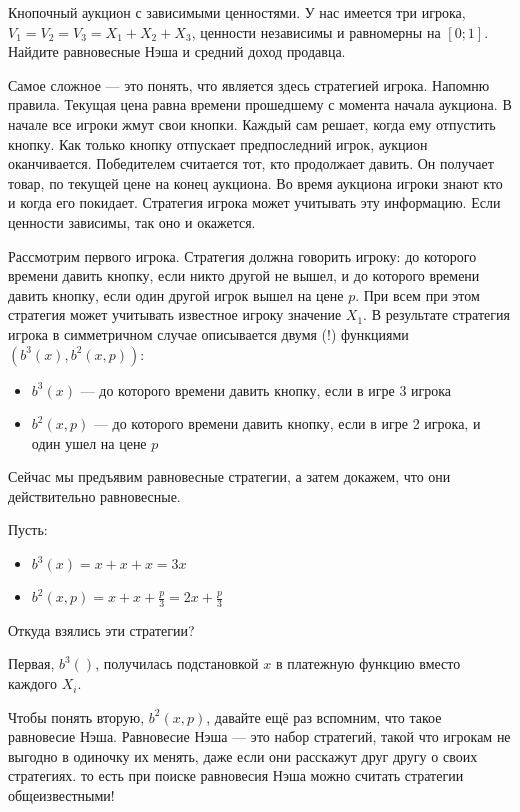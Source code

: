 \begin{myex} Кнопочный аукцион с зависимыми ценностями.
У нас имеется три игрока, $ V_{1}=V_{2}=V_{3}=X_{1}+X_{2}+X_{3} $, ценности независимы и равномерны на $ [0;1] $. Найдите равновесные Нэша и средний доход продавца.

Самое сложное — это понять, что является здесь стратегией игрока. Напомню правила. Текущая цена равна времени прошедшему с момента начала аукциона. В начале все игроки жмут свои кнопки. Каждый сам решает, когда ему отпустить кнопку. Как только кнопку отпускает предпоследний игрок, аукцион оканчивается. Победителем считается тот, кто продолжает давить. Он получает товар, по текущей цене на конец аукциона. Во время аукциона игроки знают кто и когда его покидает. Стратегия игрока может учитывать эту информацию. Если ценности зависимы, так оно и окажется.

Рассмотрим первого игрока. Стратегия должна говорить игроку: до которого времени давить кнопку, если никто другой не вышел, и до которого времени давить кнопку, если один другой игрок вышел на цене $ p $. При всем при этом стратегия может учитывать известное игроку значение $ X_{1} $. В результате стратегия игрока в симметричном случае описывается двумя (!) функциями $ (b^{3}(x), b^{2}(x,p)) $:
\begin{itemize}
\item $ b^{3}(x) $ — до которого времени давить кнопку, если в игре 3 игрока
\item $ b^{2}(x,p) $ — до которого времени давить кнопку, если в игре 2 игрока, и один ушел на цене $ p $
\end{itemize}


Сейчас мы предъявим равновесные стратегии, а затем докажем, что они действительно равновесные.

Пусть:
\begin{itemize}
\item $ b^{3}(x)=x+x+x=3x$
\item $ b^{2}(x,p)=x+x+\frac{p}{3}=2x+\frac{p}{3}$
\end{itemize}

Откуда взялись эти стратегии?


Первая, $ b^{3}() $, получилась подстановкой $ x $ в платежную функцию вместо каждого $ X_{i} $.

Чтобы понять вторую, $ b^{2}(x,p) $, давайте ещё раз вспомним, что такое равновесие Нэша.  Равновесие Нэша — это набор стратегий, такой что игрокам не выгодно в одиночку их менять, даже если они расскажут друг другу о своих стратегиях. то есть при поиске равновесия Нэша можно считать стратегии общеизвестными!


\end{myex}
